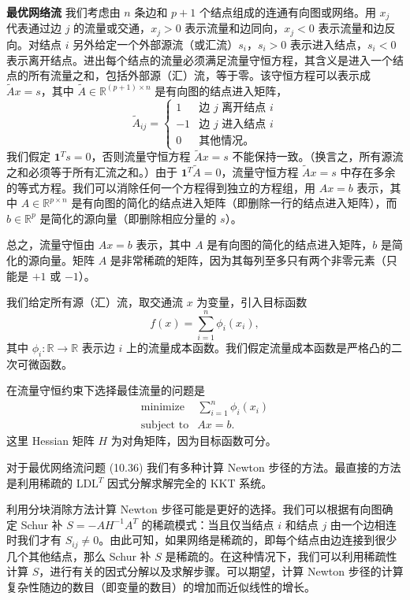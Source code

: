 \documentclass[UTF8, 12pt, fontset=fandol, oneside]{ctexart}
\begin{document}
\noindent\textbf{最优网络流}\quad
我们考虑由 $n$ 条边和 $p+1$ 个结点组成的连通有向图或网络。用 $x_j$ 代表通过边 $j$ 的流量或交通，$x_j>0$ 表示流量和边同向，$x_j<0$ 表示流量和边反向。对结点 $i$ 另外给定一个外部源流（或汇流）$s_i$，$s_i>0$ 表示进入结点，$s_i<0$ 表示离开结点。进出每个结点的流量必须满足流量守恒方程，其含义是进入一个结点的所有流量之和，包括外部源（汇）流，等于零。该守恒方程可以表示成 $\tilde A x=s$，其中 $\tilde A\in\mathbb{R}^{(p+1)\times n}$ 是有向图的结点进入矩阵，
\[
\tilde A_{ij}=
\begin{cases}
1 & \mbox{边 }j\mbox{ 离开结点 }i\\
-1 & \mbox{边 }j\mbox{ 进入结点 }i\\
0 & \mbox{其他情况。}
\end{cases}
\]
我们假定 $\mathbf{1}^Ts=0$，否则流量守恒方程 $\tilde A x=s$ 不能保持一致。（换言之，所有源流之和必须等于所有汇流之和。）由于 $\mathbf{1}^T\tilde A=0$，流量守恒方程 $\tilde A x=s$ 中存在多余的等式方程。我们可以消除任何一个方程得到独立的方程组，用 $Ax=b$ 表示，其中 $A\in\mathbb{R}^{p\times n}$ 是有向图的简化的结点进入矩阵（即删除一行的结点进入矩阵），而 $b\in\mathbb{R}^p$ 是简化的源向量（即删除相应分量的 $s$）。

总之，流量守恒由 $Ax=b$ 表示，其中 $A$ 是有向图的简化的结点进入矩阵，$b$ 是简化的源向量。矩阵 $A$ 是非常稀疏的矩阵，因为其每列至多只有两个非零元素（只能是 $+1$ 或 $-1$）。

我们给定所有源（汇）流，取交通流 $x$ 为变量，引入目标函数
\[
f(x)=\sum_{i=1}^n\phi_i(x_i),
\]
其中 $\phi_i:\mathbb{R}\to\mathbb{R}$ 表示边 $i$ 上的流量成本函数。我们假定流量成本函数是严格凸的二次可微函数。

在流量守恒约束下选择最佳流量的问题是
\begin{equation}
\begin{array}{ll}
\mbox{minimize} & \displaystyle\sum_{i=1}^n\phi_i(x_i)\\
\mbox{subject to} & Ax=b.
\end{array}
\tag{10.36}
\end{equation}
这里 Hessian 矩阵 $H$ 为对角矩阵，因为目标函数可分。

对于最优网络流问题 (10.36) 我们有多种计算 Newton 步径的方法。最直接的方法是利用稀疏的 LDL$^T$ 因式分解求解完全的 KKT 系统。

利用分块消除方法计算 Newton 步径可能是更好的选择。我们可以根据有向图确定 Schur 补 $S=-AH^{-1}A^T$ 的稀疏模式：当且仅当结点 $i$ 和结点 $j$ 由一个边相连时我们才有 $S_{ij}\neq0$。由此可知，如果网络是稀疏的，即每个结点由边连接到很少几个其他结点，那么 Schur 补 $S$ 是稀疏的。在这种情况下，我们可以利用稀疏性计算 $S$，进行有关的因式分解以及求解步骤。可以期望，计算 Newton 步径的计算复杂性随边的数目（即变量的数目）的增加而近似线性的增长。
\end{document}

